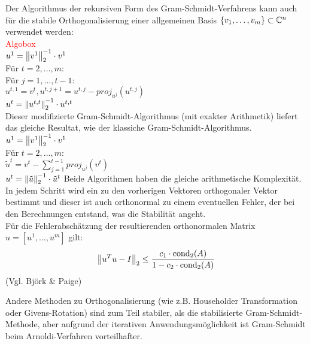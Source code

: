 \begin{rembox}
  Der Algorithmus der rekursiven Form des Gram-Schmidt-Verfahrens kann auch für die stabile Orthogonalisierung einer 
  allgemeinen Basis $\{v_1,\dots,v_m\}\subset\mathbb C  ^n$ verwendet werden:\\
  \textcolor{red}{Algobox} \\
  $u^1=\vertn{2}{v^1}_2^{-1}\cdot v^1$ \\
  Für $t=2,...,m$:  \\
  Für $j=1,...,t-1$: \\
  $u^{t,1}=v^t, u^{t,j+1}=u^{t,j}-proj_{u^{j}}(u^{t,j})$ \\
  $u^t=\vertn{2}{u^{t,t}}_2^{-1}\cdot u^{t,t}$ \\
  Dieser modifizierte Gram-Schmidt-Algorithmus (mit exakter Arithmetik) liefert das gleiche Resultat, 
  wie der klassiche Gram-Schmidt-Algorithmus. \\
  $u^1=\vertn{2}{v^1}_2^{-1}\cdot v^1$ \\
  Für $t=2,...,m$: \\
  $\tilde{u}^t = v^t - \sum_{j=1}^{t-1} proj_{u^j}(v^t)$ \\
  $u^t = \vertn{2}{\tilde{u}}_2^{-1}\cdot\tilde{u}^t$
  Beide Algorithmen haben die gleiche arithmetische Komplexität. \\
  In jedem Schritt wird ein zu den vorherigen Vektoren orthogonaler Vektor bestimmt und dieser ist auch orthonormal
  zu einem eventuellen Fehler, der bei den Berechnungen entstand, was die Stabilität angeht.\\
  Für die Fehlerabschätzung der resultierenden orthonormalen Matrix $u=[u^1,\dots,u^m]$ gilt:
  \begin{align*}
    \vertn{2}{u^Tu-I}_2 \leq \dfrac{c_1\cdot \Cond_2(A)}{1-c_2\cdot\Cond_2(A)}
  \end{align*}
  (Vgl. Björk \& Paige)
\end{rembox}
\begin{rembox}
  Andere Methoden zu Orthogonalisierung (wie z.B. Householder Transformation oder Givens-Rotation) sind zum Teil 
  stabiler, als die stabilisierte Gram-Schmidt-Methode, aber aufgrund der iterativen Anwendungsmöglichkeit ist 
  Gram-Schmidt beim Arnoldi-Verfahren vorteilhafter.
\end{rembox}

